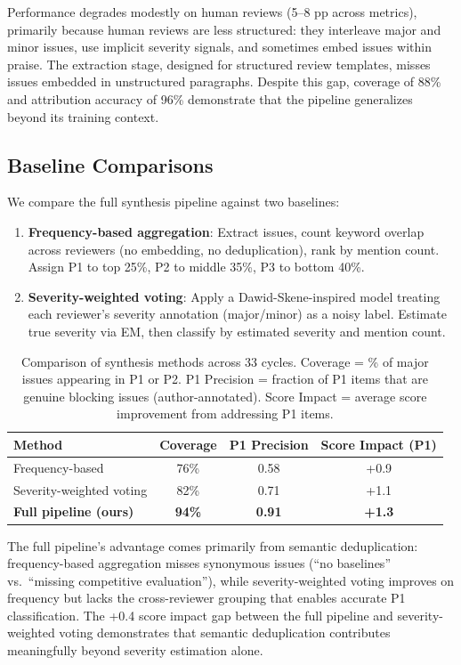 Performance degrades modestly on human reviews (5--8 pp across metrics), primarily because human reviews are less structured: they interleave major and minor issues, use implicit severity signals, and sometimes embed issues within praise. The extraction stage, designed for structured review templates, misses issues embedded in unstructured paragraphs. Despite this gap, coverage of 88\% and attribution accuracy of 96\% demonstrate that the pipeline generalizes beyond its training context.

\subsection{Baseline Comparisons}

We compare the full synthesis pipeline against two baselines:

\begin{enumerate}
    \item \textbf{Frequency-based aggregation}: Extract issues, count keyword overlap across reviewers (no embedding, no deduplication), rank by mention count. Assign P1 to top 25\%, P2 to middle 35\%, P3 to bottom 40\%.
    \item \textbf{Severity-weighted voting}: Apply a Dawid-Skene-inspired model treating each reviewer's severity annotation (major/minor) as a noisy label. Estimate true severity via EM, then classify by estimated severity and mention count.
\end{enumerate}

\begin{table}[h]
\centering
\small
\begin{tabular}{lccc}
\toprule
Method & Coverage & P1 Precision & Score Impact (P1) \\
\midrule
Frequency-based & 76\% & 0.58 & +0.9 \\
Severity-weighted voting & 82\% & 0.71 & +1.1 \\
\textbf{Full pipeline (ours)} & \textbf{94\%} & \textbf{0.91} & \textbf{+1.3} \\
\bottomrule
\end{tabular}
\caption{Comparison of synthesis methods across 33 cycles. Coverage = \% of major issues appearing in P1 or P2. P1 Precision = fraction of P1 items that are genuine blocking issues (author-annotated). Score Impact = average score improvement from addressing P1 items.}
\label{tab:baselines}
\end{table}

The full pipeline's advantage comes primarily from semantic deduplication: frequency-based aggregation misses synonymous issues (``no baselines'' vs.\ ``missing competitive evaluation''), while severity-weighted voting improves on frequency but lacks the cross-reviewer grouping that enables accurate P1 classification. The +0.4 score impact gap between the full pipeline and severity-weighted voting demonstrates that semantic deduplication contributes meaningfully beyond severity estimation alone.


